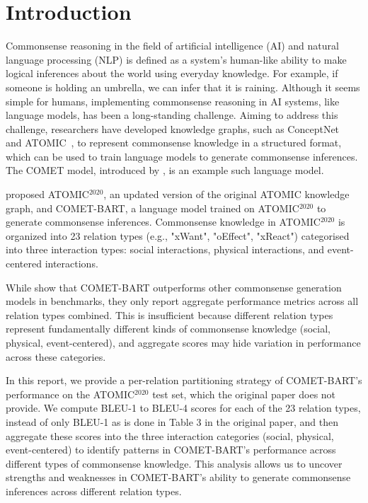 \section{Introduction}


Commonsense reasoning in the field of artificial intelligence (AI) and natural language processing (NLP) is defined as a system's human-like ability to make logical inferences about the world using everyday knowledge. For example, if someone is holding an umbrella, we can infer that it is raining. Although it seems simple for humans, implementing commonsense reasoning in AI systems, like language models, has been a long-standing challenge. Aiming to address this challenge, researchers have developed knowledge graphs, such as ConceptNet~\cite{speer2012conceptnet, speer2017conceptnet} and ATOMIC~\cite{sap2019atomic}, to represent commonsense knowledge in a structured format, which can be used to train language models to generate commonsense inferences. The COMET model, introduced by \citet{bosselut-etal-2019-comet}, is an example such language model.


\citet{hwang2021cometatomic} proposed ATOMIC$^{2020}$, an updated version of the original ATOMIC knowledge graph, and COMET-BART, a language model trained on ATOMIC$^{2020}$ to generate commonsense inferences. Commonsense knowledge in ATOMIC$^{2020}$ is organized into 23 relation types (e.g., "xWant", "oEffect", "xReact") categorised into three interaction types: social interactions, physical interactions, and event-centered interactions.



While \citet{hwang2021cometatomic} show that COMET-BART outperforms other commonsense generation models in benchmarks, they only report aggregate performance metrics across all relation types combined. This is insufficient because different relation types represent fundamentally different kinds of commonsense knowledge (social, physical, event-centered), and aggregate scores may hide variation in performance across these categories.



In this report, we provide a per-relation partitioning strategy of COMET-BART's performance on the ATOMIC$^{2020}$ test set, which the original paper does not provide. We compute BLEU-1 to BLEU-4 scores for each of the 23 relation types, instead of only BLEU-1 as is done in Table 3 in the original paper, and then aggregate these scores into the three interaction categories (social, physical, event-centered) to identify patterns in COMET-BART's performance across different types of commonsense knowledge. This analysis allows us to uncover strengths and weaknesses in COMET-BART's ability to generate commonsense inferences across different relation types.

